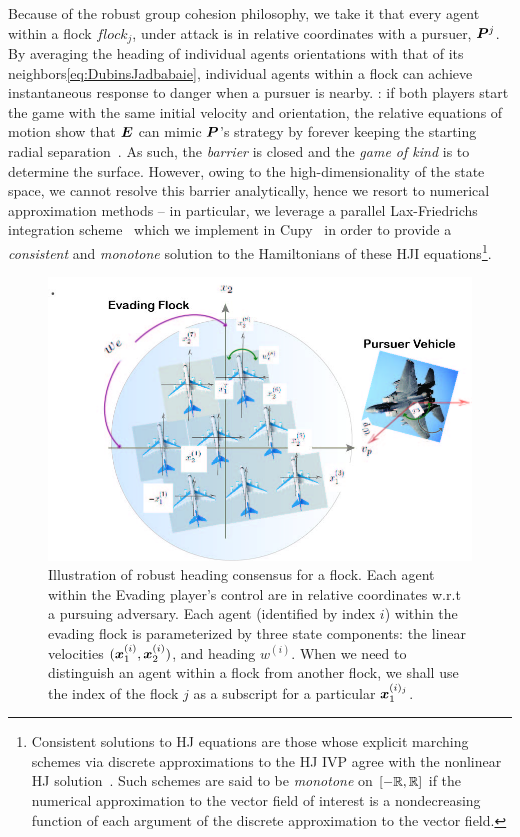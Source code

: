 Because of the robust group cohesion philosophy, we take it that every agent within a flock $flock_j$, under attack is in relative coordinates with a pursuer, $\bm{P}^j$. By averaging the heading of individual agents orientations with that of its neighbors\cf \eqref{eq:DubinsJadbabaie}, individual agents within a flock can achieve  instantaneous  response to danger when a pursuer is nearby. : if both players start the game with the same initial velocity and orientation, the relative equations of motion show that $\bm{E}$ can mimic $\bm{P}$'s strategy by forever keeping the starting radial separation~\cite{Merz1972}. As such, the \textit{barrier} is closed and the \textit{game of kind} is to determine the surface. However, owing to the high-dimensionality of the state space, we cannot resolve this barrier analytically, hence we resort to numerical approximation methods -- in particular, we leverage a parallel Lax-Friedrichs integration scheme~\cite{Crandall1984} which we implement in Cupy~\cite{CuPy} in order to provide a \textit{consistent} and \textit{monotone} solution to the Hamiltonians of these HJI equations\footnote{Consistent solutions to HJ equations are those whose explicit marching schemes via discrete  approximations to the HJ IVP agree with the nonlinear HJ solution~\cite{Crandall1984Approx}. Such schemes are said to be \textit{monotone} \eg on $\left[-\mathbb{R}, \mathbb{R}\right]$ if the numerical approximation to the vector field of interest is a nondecreasing function of each argument of the discrete approximation to the vector field.}. 
%
\begin{figure}[tb!]
\centering
\includegraphics[width=\columnwidth]{figures/flock_pursuer.jpg}
\caption{Illustration of robust heading consensus for a flock. Each agent within the Evading player's control are in relative coordinates w.r.t a pursuing adversary. Each agent (identified by index $i$) within the evading flock is parameterized by three state components: the linear velocities $(\bm{x}_1^{(i)}, \bm{x}_2^{(i)})$, and heading $w^{(i)}$. When we need to distinguish an agent within a flock from another flock, we shall use the index of the flock \eg $j$ as a subscript for a particular \eg  $\bm{x}_1^{(i)_j}$.}
\label{fig:robust_heading}
\end{figure}

